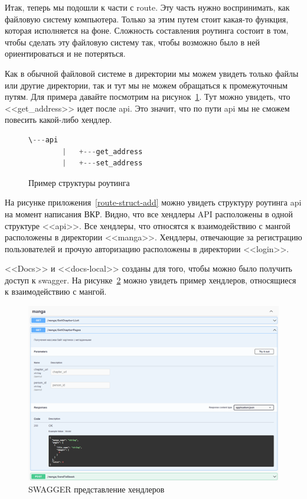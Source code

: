 Итак, теперь мы подошли к части с route. 
Эту часть нужно воспринимать, как файловую систему компьютера.
Только за этим путем стоит какая-то функция, которая исполняется на фоне.
Сложность составления роутинга состоит в том, чтобы сделать эту файловую систему так, чтобы возможно было в ней ориентироваться и не потеряться.

Как в обычной файловой системе в директории мы можем увидеть только файлы или другие директории, так и тут мы не можем обращаться к промежуточным путям.
Для примера давайте посмотрим на рисунок~\ref{route-struct}.
Тут можно увидеть, что <<get\_address>> идет после api. Это значит, что по пути api мы не сможем повесить какой-либо хендлер.

\begin{figure}
    \begin{lstlisting}[language=go]
        \---api
        |   +---get_address
        |   +---set_address
    \end{lstlisting}
    \caption{Пример структуры роутинга}
    \label{route-struct}
\end{figure}

На рисунке приложения~\ref{route-struct-add} можно увидеть структуру роутинга api на момент написания ВКР.
Видно, что все хендлеры API расположены в одной структуре <<api>>. 
Все хендлеры, что относятся к взаимодействию с мангой расположены в директории <<manga>>. 
Хендлеры, отвечающие за регистрацию пользователей и прочую авторизацию расположены в директории <<login>>. 

<<Docs>> и <<docs-local>> созданы для того, чтобы можно было получить доступ к swagger.
На рисунке~\ref{swagger-pic} можно увидеть пример хендлеров, относящиеся к взаимодействию с мангой.

\begin{figure}
    \includegraphics[scale=0.8]{imgs/swagger}
    \caption{SWAGGER представление хендлеров}
    \label{swagger-pic}
\end{figure}


